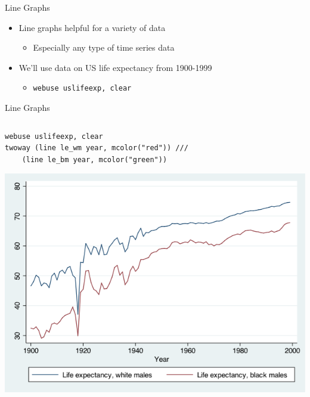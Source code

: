 \documentclass[table,smaller]{beamer}
\begin{document}
\begin{frame}[fragile,label=sec-4-1]{Line Graphs}
 \begin{itemize}
\item Line graphs helpful for a variety of data
\begin{itemize}
\item Especially any type of time series data
\end{itemize}
\item We’ll use data on US life expectancy from 1900-1999
\begin{itemize}
\item \texttt{webuse uslifeexp, clear}
\end{itemize}
\end{itemize}
\end{frame}
\begin{frame}[fragile,label=sec-4-2]{Line Graphs}
 \vspace{-.5em} \begin{columns}  \begin{block}{}
\begin{verbatim}
webuse uslifeexp, clear
twoway (line le_wm year, mcolor("red")) ///
    (line le_bm year, mcolor("green"))
\end{verbatim}

\includegraphics[width=.9\linewidth]{./images/lineGraph1.png}

\end{block} \end{columns}
\end{frame}
\end{document}

